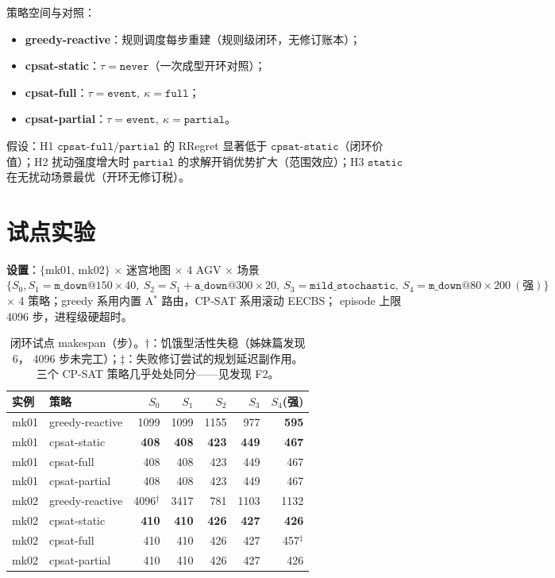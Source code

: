\documentclass[UTF8,12pt,a4paper]{ctexart}
\begin{document}
策略空间与对照：
\begin{itemize}
  \item \textbf{greedy-reactive}：规则调度每步重建（规则级闭环，无修订账本）；
  \item \textbf{cpsat-static}：$\tau=\texttt{never}$（一次成型开环对照）；
  \item \textbf{cpsat-full}：$\tau=\texttt{event},\ \kappa=\texttt{full}$；
  \item \textbf{cpsat-partial}：$\tau=\texttt{event},\ \kappa=\texttt{partial}$。
\end{itemize}
假设：H1 $\texttt{cpsat-full/partial}$ 的 RRegret 显著低于
$\texttt{cpsat-static}$（闭环价值）；H2 扰动强度增大时
$\texttt{partial}$ 的求解开销优势扩大（范围效应）；H3
$\texttt{static}$ 在无扰动场景最优（开环无修订税）。

\section{试点实验}\label{sec:pilot}

\textbf{设置}：$\{$mk01, mk02$\}$ $\times$ 迷宫地图 $\times$ 4 AGV $\times$
场景 $\{S_0, S_1{=}\texttt{m\_down}@150{\times}40,\ 
S_2{=}S_1{+}\texttt{a\_down}@300{\times}20,\ 
S_3{=}\texttt{mild\_stochastic},\ S_4{=}\texttt{m\_down}@80{\times}200\ (\text{强})\}$
$\times$ 4 策略；greedy 系用内置 A$^*$ 路由，CP-SAT 系用滚动 EECBS；
episode 上限 4096 步，进程级硬超时。

\begin{table}[h]
\centering
\begin{tabular}{llrrrrr}
\toprule
实例 & 策略 & $S_0$ & $S_1$ & $S_2$ & $S_3$ & $S_4$(强) \\
\midrule
mk01 & greedy-reactive & 1099 & 1099 & 1155 & 977 & \textbf{595} \\
mk01 & cpsat-static    & \textbf{408} & \textbf{408} & \textbf{423} & \textbf{449} & \textbf{467} \\
mk01 & cpsat-full      & 408 & 408 & 423 & 449 & 467 \\
mk01 & cpsat-partial   & 408 & 408 & 423 & 449 & 467 \\
\midrule
mk02 & greedy-reactive & 4096$^\dagger$ & 3417 & 781 & 1103 & 1132 \\
mk02 & cpsat-static    & \textbf{410} & \textbf{410} & \textbf{426} & \textbf{427} & \textbf{426} \\
mk02 & cpsat-full      & 410 & 410 & 426 & 427 & 457$^\ddagger$ \\
mk02 & cpsat-partial   & 410 & 410 & 426 & 427 & 426 \\
\bottomrule
\end{tabular}
\caption{闭环试点 makespan（步）。$\dagger$：饥饿型活性失稳（姊妹篇发现6，
4096 步未完工）；$\ddagger$：失败修订尝试的规划延迟副作用。
三个 CP-SAT 策略几乎处处同分——见发现 F2。}
\label{tab:closemain}
\end{table}
\end{document}
